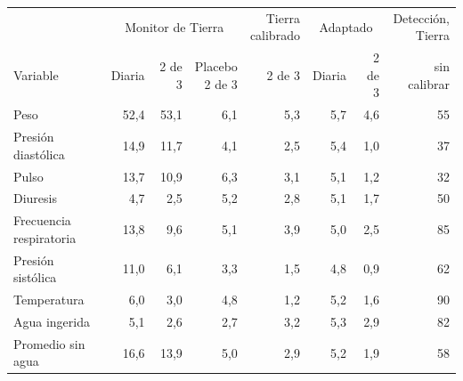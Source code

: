 \begin{tabular}{lrrrrrrr}\toprule
 & \multicolumn{3}{c}{Monitor de Tierra} & \makecell{Tierra\\calibrado} & \multicolumn{2}{c}{Adaptado} & \makecell{Detección,\\Tierra} \\
\cmidrule(lr){2-4}\cmidrule(lr){5-5}\cmidrule(lr){6-7}
 Variable & Diaria & 2 de 3 & \makecell{Placebo\\2 de 3} & 2 de 3 & Diaria & 2 de 3 & sin calibrar \\
\midrule
Peso & 52,4 & 53,1 & 6,1 & 5,3 & 5,7 & 4,6 & 55 \\
Presión diastólica & 14,9 & 11,7 & 4,1 & 2,5 & 5,4 & 1,0 & 37 \\
Pulso & 13,7 & 10,9 & 6,3 & 3,1 & 5,1 & 1,2 & 32 \\
Diuresis & 4,7 & 2,5 & 5,2 & 2,8 & 5,1 & 1,7 & 50 \\
Frecuencia respiratoria & 13,8 & 9,6 & 5,1 & 3,9 & 5,0 & 2,5 & 85 \\
Presión sistólica & 11,0 & 6,1 & 3,3 & 1,5 & 4,8 & 0,9 & 62 \\
Temperatura & 6,0 & 3,0 & 4,8 & 1,2 & 5,2 & 1,6 & 90 \\
Agua ingerida & 5,1 & 2,6 & 2,7 & 3,2 & 5,3 & 2,9 & 82 \\
\midrule Promedio sin agua & 16,6 & 13,9 & 5,0 & 2,9 & 5,2 & 1,9 & 58 \\
\bottomrule\end{tabular}

